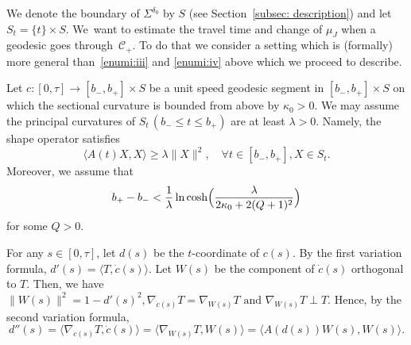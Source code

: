 \documentclass[JEP,XML,SOM,Unicode,NoFloatCountersInSection]{cedram}
\theoremstyle{definition}
\renewcommand{\>}{{\rangle}}
\newcommand{\<}{{\langle}}
\begin{document}
We denote the boundary of $\Sigma^{\delta_0}$ by $S$ (see Section~\ref{subsec: description}) and let $S_t=\{t\}\times S$.
We~want to estimate the travel time and change of $\mu_J$ when a geodesic goes through~$\mathcal{C}_+$. { To do that we consider} a setting which is (formally) more general than~\eqref{enumi:iii} and \eqref{enumi:iv} above which we proceed to describe.

Let $c: [0,\tau]\to [b_-, b_+] \times S $ be a unit speed geodesic segment in $[b_-, b_+] \times S$ on which the sectional curvature is bounded from above by $\kappa_0>0$. We may assume the principal curvatures of $S_t\,(b_-\leq t\leq b_+)$ are at least $\lambda>0$. Namely, the shape operator satisfies
\begin{equation}\label{eq: lower_bd_A}
\langle A(t)X,X\rangle\geq \lambda \|X\|^2,\quad \forall t\in[b_-, b_+], X\in S_t.
\end{equation}
Moreover, we assume that
\begin{equation}\label{eq: lower_bd_width}
b_+-b_-<\frac{1}{\lambda}\ln\cosh\Bigl(\frac{\lambda}{2\kappa_0+2(Q+1)^2}\Bigr)
\end{equation}
for some $Q>0$.

For any $s\in[0,\tau]$, let $d(s)$ be the $t$-coordinate of $c(s)$. By the first variation formula, $d'(s)=\langle T, \dot{c}(s)\rangle$. Let $W(s)$ be the component of $\dot{c}(s)$ orthogonal to $T$. Then, we have $\|W(s)\|^2=1-d'(s)^2, \nabla_{\dot{c}(s)} T=\nabla_{W(s)} T\text{ and }\nabla_{W(s)} T\perp T.$ Hence, by the second variation formula,
\begin{equation}\label{eq: d''}
d''(s)=\langle \nabla_ {\dot{c}(s)} T, \dot{c}(s)\rangle=\langle \nabla_ {W(s)} T, W(s)\rangle=\langle A(d(s))W(s), W(s)\rangle.
\end{equation}
\end{document}
